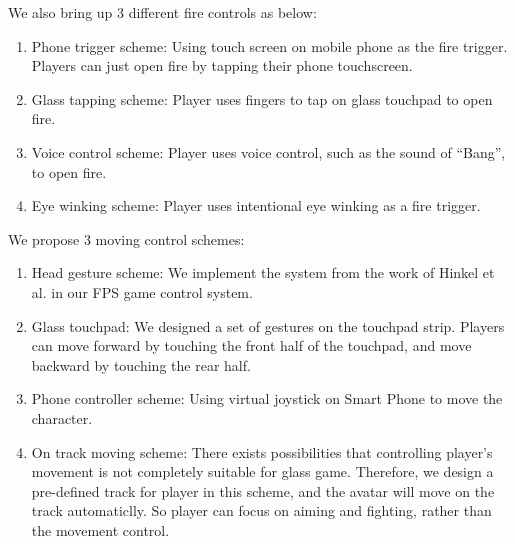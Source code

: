 \documentclass{acm_proc_article-sp}
\begin{document}
We also bring up 3 different fire controls as below:

\begin{enumerate}
\item Phone trigger scheme: Using touch screen on mobile phone as the fire trigger. Players can just open fire by tapping their phone touchscreen.

\item Glass tapping scheme: Player uses fingers to tap on glass touchpad to open fire.

\item Voice control scheme: Player uses voice control, such as the sound of ``Bang'', to open fire.

\item Eye winking scheme: Player uses intentional eye winking as a fire trigger.
\end{enumerate}

We propose 3 moving control schemes:

\begin{enumerate}
\item Head gesture scheme: We implement the system from the work of Hinkel et al.\cite{wheel} in our FPS game control system.

\item Glass touchpad: We designed a set of gestures on the touchpad strip. Players can move forward by touching the front half of the touchpad, and move backward by touching the rear half.

\item Phone controller scheme: Using virtual joystick on Smart Phone to move the character.

\item On track moving scheme: There exists possibilities that controlling player's movement is not completely suitable for glass game. Therefore, we design a pre-defined track for player in this scheme, and the avatar will move on the track automaticlly. So player can focus on aiming and fighting, rather than the movement control.
\end{enumerate}
\end{document}
